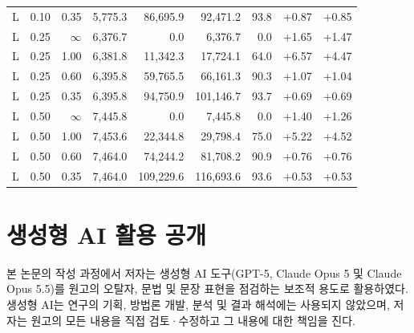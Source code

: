 \documentclass[10pt,a4paper]{article}
\begin{document}
\begin{table}[H]
\begin{tabular}{@{}llrrrrrrr@{}}
L & 0.10 & 0.35 & 5,775.3 & 86,695.9 & 92,471.2 & 93.8 & +0.87 & +0.85\\
L & 0.25 & $\infty$ & 6,376.7 & 0.0 & 6,376.7 & 0.0 & +1.65 & +1.47\\
L & 0.25 & 1.00 & 6,381.8 & 11,342.3 & 17,724.1 & 64.0 & +6.57 & +4.47\\
L & 0.25 & 0.60 & 6,395.8 & 59,765.5 & 66,161.3 & 90.3 & +1.07 & +1.04\\
L & 0.25 & 0.35 & 6,395.8 & 94,750.9 & 101,146.7 & 93.7 & +0.69 & +0.69\\
L & 0.50 & $\infty$ & 7,445.8 & 0.0 & 7,445.8 & 0.0 & +1.40 & +1.26\\
L & 0.50 & 1.00 & 7,453.6 & 22,344.8 & 29,798.4 & 75.0 & +5.22 & +4.52\\
L & 0.50 & 0.60 & 7,464.0 & 74,244.2 & 81,708.2 & 90.9 & +0.76 & +0.76\\
L & 0.50 & 0.35 & 7,464.0 & 109,229.6 & 116,693.6 & 93.6 & +0.53 & +0.53\\
\bottomrule
\end{tabular}
\end{table}

\section*{생성형 AI 활용 공개}
본 논문의 작성 과정에서 저자는 생성형 AI 도구(GPT-5, Claude Opus 5 및 Claude Opus 5.5)를 원고의 오탈자, 문법 및 문장 표현을 점검하는 보조적 용도로 활용하였다. 생성형 AI는 연구의 기획, 방법론 개발, 분석 및 결과 해석에는 사용되지 않았으며, 저자는 원고의 모든 내용을 직접 검토·수정하고 그 내용에 대한 책임을 진다.
\end{document}
